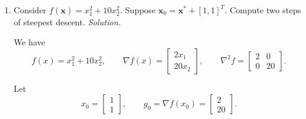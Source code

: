 \documentclass[11pt]{article}
\begin{document}
\begin{enumerate}[label=\textbf{1(\alph*)}]
\begin{enumerate}[label=\roman*.]
			\item Is the stepsize relatively large for large $x_1$? Explain.\\
			\textit{Solution} No. The stepsize does \emph{not} grow with $x_1$ since $\alpha^\ast=\frac{1}{2a}$ is independent of $x_1$.\\
			
			\item Is the step $\|\alpha \bm{p}_k\|$ relatively large for large $x_1$? Explain.\\
			\textit{Solution} Yes. The step magnitude is
			\[
			\|\alpha^\ast p_k\|=\Big\lvert \tfrac{1}{2a}(-2a 		x_{1,k})\Big\rvert=\lvert x_{1,k}\rvert,
			\]
			so it grows linearly with $\lvert x_1\rvert$.\\

			\item What happens to the stepsize as we approach the optimal point? Explain.\\
			\textit{Solution (iv)} As $x_1\to x^\ast=0$, the stepsize stays constant: $\alpha^\ast=\tfrac{1}{2a}$ (for fixed $a>0$).\\
			
			\item What happens to the step $\|\alpha \bm{p}_k\|$ as we approach the optimal point? Explain.\\
			\textit{Solution} As $x_1\to 0$, the step norm tends to zero linearly:
			\[
			\|\alpha^\ast p_k\|=\lvert x_{1,k}\rvert \;\longrightarrow\; 0.
			\]
		\end{enumerate}
		
		\item Consider $f(\bm{x}) = x_1^2 + 10x_2^2$. Suppose $\bm{x}_0 = \bm{x}^\ast + [1,1]^T$. Compute two steps of steepest descent.
		\textit{Solution.}
		
		We have
		\[
		f(x)=x_1^2 + 10x_2^2, \qquad
		\nabla f(x)=
		\begin{bmatrix}
			2x_1 \\
			20x_2
		\end{bmatrix}, \qquad
		\nabla^2 f=
		\begin{bmatrix}
			2 & 0 \\
			0 & 20
		\end{bmatrix}.
		\]
		
		Let
		\[
		x_0 = 
		\begin{bmatrix}
			1 \\
			1
		\end{bmatrix}, \qquad
		g_0 = \nabla f(x_0) = 
		\begin{bmatrix}
			2 \\
			20
		\end{bmatrix}.
		\]
		

\end{enumerate}
\end{document}
